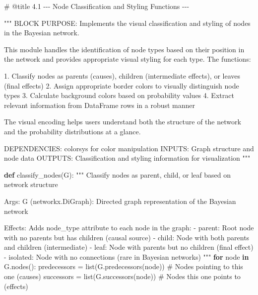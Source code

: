 \documentclass[
  11pt,
  letterpaper,
]{book}
\newenvironment{Shaded}{\begin{snugshade}}{\end{snugshade}}
\newcommand{\BuiltInTok}[1]{\textcolor[rgb]{0.00,0.23,0.31}{#1}}
\newcommand{\CommentTok}[1]{\textcolor[rgb]{0.37,0.37,0.37}{#1}}
\newcommand{\ControlFlowTok}[1]{\textcolor[rgb]{0.00,0.23,0.31}{\textbf{#1}}}
\newcommand{\KeywordTok}[1]{\textcolor[rgb]{0.00,0.23,0.31}{\textbf{#1}}}
\newcommand{\NormalTok}[1]{\textcolor[rgb]{0.00,0.23,0.31}{#1}}
\newcommand{\OperatorTok}[1]{\textcolor[rgb]{0.37,0.37,0.37}{#1}}
\begin{document}
\begin{Shaded}
\begin{Highlighting}[]
\CommentTok{\# @title 4.1 {-}{-}{-} Node Classification and Styling Functions {-}{-}{-}}

\CommentTok{"""}
\CommentTok{BLOCK PURPOSE: Implements the visual classification and styling of nodes in the Bayesian network.}

\CommentTok{This module handles the identification of node types based on their position in the network}
\CommentTok{and provides appropriate visual styling for each type. The functions:}

\CommentTok{1. Classify nodes as parents (causes), children (intermediate effects), or leaves (final effects)}
\CommentTok{2. Assign appropriate border colors to visually distinguish node types}
\CommentTok{3. Calculate background colors based on probability values}
\CommentTok{4. Extract relevant information from DataFrame rows in a robust manner}

\CommentTok{The visual encoding helps users understand both the structure of the network}
\CommentTok{and the probability distributions at a glance.}

\CommentTok{DEPENDENCIES: colorsys for color manipulation}
\CommentTok{INPUTS: Graph structure and node data}
\CommentTok{OUTPUTS: Classification and styling information for visualization}
\CommentTok{"""}

\KeywordTok{def}\NormalTok{ classify\_nodes(G):}
    \CommentTok{"""}
\CommentTok{    Classify nodes as parent, child, or leaf based on network structure}

\CommentTok{    Args:}
\CommentTok{        G (networkx.DiGraph): Directed graph representation of the Bayesian network}

\CommentTok{    Effects:}
\CommentTok{        Adds \textquotesingle{}node\_type\textquotesingle{} attribute to each node in the graph:}
\CommentTok{        {-} \textquotesingle{}parent\textquotesingle{}: Root node with no parents but has children (causal source)}
\CommentTok{        {-} \textquotesingle{}child\textquotesingle{}: Node with both parents and children (intermediate)}
\CommentTok{        {-} \textquotesingle{}leaf\textquotesingle{}: Node with parents but no children (final effect)}
\CommentTok{        {-} \textquotesingle{}isolated\textquotesingle{}: Node with no connections (rare in Bayesian networks)}
\CommentTok{    """}
    \ControlFlowTok{for}\NormalTok{ node }\KeywordTok{in}\NormalTok{ G.nodes():}
\NormalTok{        predecessors }\OperatorTok{=} \BuiltInTok{list}\NormalTok{(G.predecessors(node))  }\CommentTok{\# Nodes pointing to this one (causes)}
\NormalTok{        successors }\OperatorTok{=} \BuiltInTok{list}\NormalTok{(G.successors(node))      }\CommentTok{\# Nodes this one points to (effects)}


\end{Highlighting}
\end{Shaded}
\end{document}
